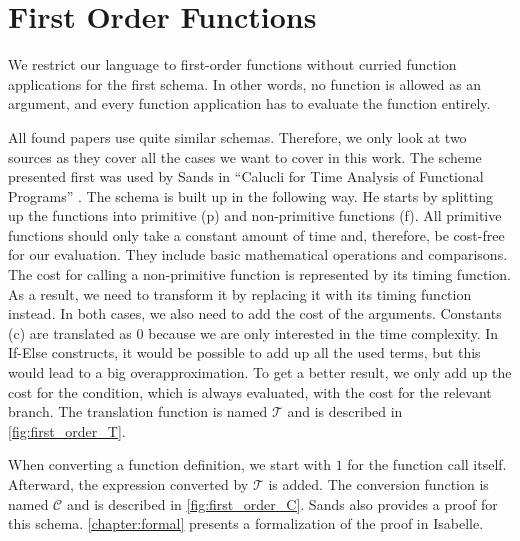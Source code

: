 

\section{First Order Functions} \label{chapter:first_order}

We restrict our language to first-order functions without curried function applications for the first schema.
In other words, no function is allowed as an argument, and every function application has to evaluate the function entirely.

All found papers use quite similar schemas.
Therefore, we only look at two sources as they cover all the cases we want to cover in this work.
The scheme presented first was used by Sands in ``Calucli for Time Analysis of Functional Programs'' \parencite{sands}.
The schema is built up in the following way.
He starts by splitting up the functions into primitive (p) and non-primitive functions (f).
All primitive functions should only take a constant amount of time and, therefore, be cost-free for our evaluation.
They include basic mathematical operations and comparisons.
The cost for calling a non-primitive function is represented by its timing function.
As a result, we need to transform it by replacing it with its timing function instead.
In both cases, we also need to add the cost of the arguments.
Constants (c) are translated as $0$ because we are only interested in the time complexity.
In If-Else constructs, it would be possible to add up all the used terms,
but this would lead to a big overapproximation.
To get a better result, we only add up the cost for the condition, which is always evaluated, with the cost for the relevant branch.
The translation function is named $\mathcal{T}$ and is described in \autoref{fig:first_order_T}.

When converting a function definition, we start with $1$ for the function call itself.
Afterward, the expression converted by $\mathcal{T}$ is added.
The conversion function is named $\mathcal{C}$ and is described in \autoref{fig:first_order_C}.
Sands also provides a proof for this schema.
\autoref{chapter:formal} presents a formalization of the proof in Isabelle.

